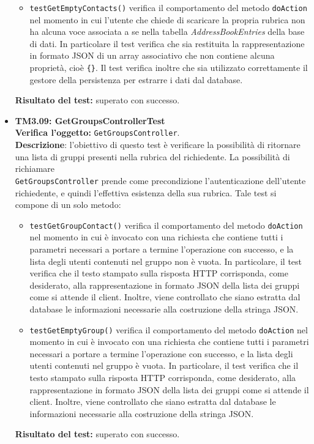 \begin{itemize}
\begin{itemize}
\item \texttt{testGetEmptyContacts()} verifica il comportamento del metodo \texttt{doAction} nel momento in cui l'utente che chiede di scaricare la propria rubrica non ha alcuna voce associata a se nella tabella \textit{AddressBookEntries} della base di dati. In particolare il test verifica che sia restituita la rappresentazione in formato JSON di un array associativo che non contiene alcuna proprietà, cioè \texttt{\{\}}. Il test verifica inoltre che sia utilizzato correttamente il gestore della persistenza per estrarre i dati dal database.
\end{itemize}
\textbf{Risultato del test:} superato con successo.


\item \textbf{TM3.09: GetGroupsControllerTest}\\
\textbf{Verifica l'oggetto:} \texttt{GetGroupsController}.\\
\textbf{Descrizione}: l'obiettivo di questo test è verificare la possibilità di ritornare una lista di gruppi presenti nella rubrica del richiedente.
La possibilità di richiamare\\ \texttt{GetGroupsController} prende come precondizione l'autenticazione dell'utente richiedente, e quindi l'effettiva esistenza della sua rubrica.
Tale test si compone di un solo metodo:
\begin{itemize}

\item \texttt{testGetGroupContact()} verifica il comportamento del metodo \texttt{doAction} nel momento in cui è invocato con una richiesta che contiene tutti i parametri necessari a portare a termine l'operazione con successo, e la lista degli utenti contenuti nel gruppo non è vuota. In particolare, il test verifica che il testo stampato sulla risposta HTTP corrisponda, come desiderato, alla rappresentazione in formato JSON della lista dei gruppi come si attende il client. Inoltre, viene controllato che siano estratta dal database le informazioni necessarie alla costruzione della stringa JSON.

\item \texttt{testGetEmptyGroup()} verifica il comportamento del metodo \texttt{doAction} nel momento in cui è invocato con una richiesta che contiene tutti i parametri necessari a portare a termine l'operazione con successo, e la lista degli utenti contenuti nel gruppo è vuota. In particolare, il test verifica che il testo stampato sulla risposta HTTP corrisponda, come desiderato, alla rappresentazione in formato JSON della lista dei gruppi come si attende il client. Inoltre, viene controllato che siano estratta dal database le informazioni necessarie alla costruzione della stringa JSON.
\end{itemize}
\textbf{Risultato del test:} superato con successo.



\end{itemize}
